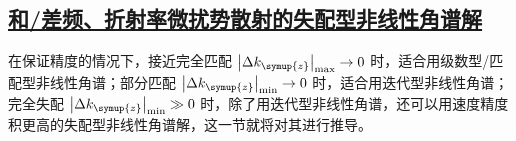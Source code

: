 \subsection{\protect\hyperlink{chap:\thesubsection}{和/差频、折射率微扰势散射的失配型非线性角谱解}}
\label{和/差频、折射率微扰势散射的失配型非线性角谱解}

在保证精度的情况下，接近完全匹配 $\left|\Delta k_{\symup{z}}\right|_{\max} \to 0$ 时，适合用级数型/匹配型非线性角谱；部分匹配 $\left|\Delta k_{\symup{z}}\right|_{\min} \to 0$ 时，适合用迭代型非线性角谱；完全失配 $\left|\Delta k_{\symup{z}}\right|_{\min} \gg 0$ 时，除了用迭代型非线性角谱，还可以用速度精度积更高的失配型非线性角谱解，这一节就将对其进行推导。

